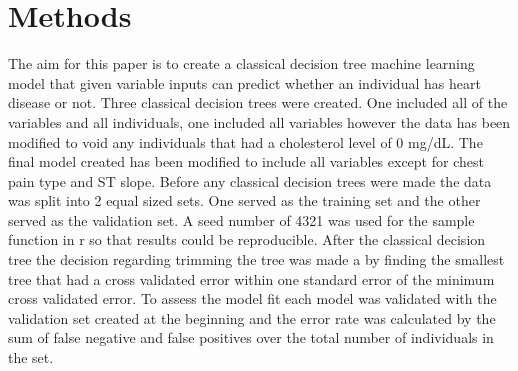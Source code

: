 \documentclass[12pt]{article}
\begin{document}
\section{Methods}
\label{sec:meth}


The aim for this paper is to create a classical decision tree machine learning model that given variable inputs can predict whether an individual has heart disease or not.
Three classical decision trees were created. One included all of the variables and all individuals, one included all variables however the data has been modified to void any individuals that had a cholesterol level of 0 mg/dL. The final model created has been modified to include all variables except for chest pain type and ST slope.
Before any classical decision trees were made the data was split into 2 equal sized sets. One served as the training set and the other served as the validation set. A seed number of 4321 was used for the sample function in r so that results could be reproducible.
After the classical decision tree the decision regarding trimming the tree was made a by finding the smallest tree that had a cross validated error within one standard error of the minimum cross validated error.
To assess the model fit each model was validated with the validation set created at the beginning and the error rate was calculated by the sum of false negative and false positives over the total number of individuals in the set.
\end{document}
